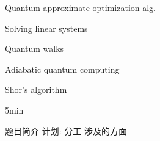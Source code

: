 \newpage

Quantum approximate optimization alg.


Solving linear systems

Quantum walks

Adiabatic quantum computing

Shor’s algorithm

5min

题目简介
计划:
    分工
    涉及的方面
